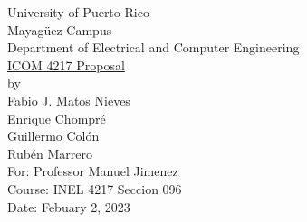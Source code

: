 \begin{titlepage}
  \begin{center}
    \large{University of Puerto Rico\\
    Mayagüez Campus\\
    \vspace{\baselineskip}
    Department of Electrical and Computer Engineering\\}
    \vspace{6cm}
    \Huge{\underline{ICOM 4217 Proposal}\\}
    \vspace{0.5\baselineskip}
    \large by\\
    Fabio J. Matos Nieves\\
    Enrique Chompré\\
    Guillermo Colón\\
    Rubén Marrero\\
    \vspace{4cm}
    For: Professor Manuel Jimenez\\
    Course: INEL 4217 Seccion 096\\
    Date: Febuary 2, 2023\\
    \normalsize

  \end{center}
\end{titlepage}

